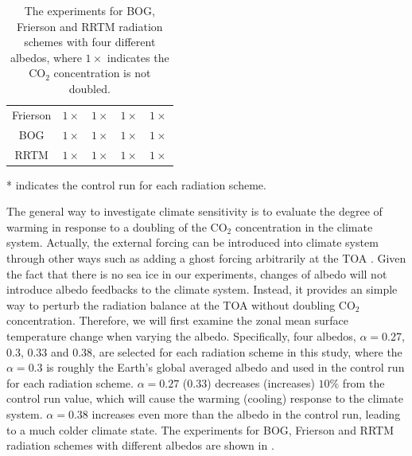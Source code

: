 \begin{table}[ht]
	\centering
	\caption{The experiments for BOG, Frierson and RRTM radiation schemes with four different albedos, where $1\times$ indicates the CO$_2$ concentration is not doubled.} %
	\vspace{0.5em}
	\renewcommand{\arraystretch}{1.3}
	\small
	\begin{threeparttable}
	\begin{tabular}{c|*{4}{c}}
		\toprule
		\diagbox{Scheme}{Albedo} &\makebox[3em]{0.38}&\makebox[3em]{0.33}&\makebox[3em]{0.3\tnote{*}}
		&\makebox[3em]{0.27}\\
	    \midrule
		Frierson & $1\times$ & $1\times$ & $1\times$ & $1\times$ \\ 
		BOG &  $1\times$ & $1\times$ & $1\times$& $1\times$ \\
		RRTM & $1\times$ & $1\times$ & $1\times$ & $1\times$ \\
		\bottomrule
	\end{tabular}%
	\begin{tablenotes}
      \item[*] indicates the control run for each radiation scheme.
     \end{tablenotes}
	\end{threeparttable}
	\label{tab:exp_table}
\end{table}

The general way to investigate climate sensitivity is to evaluate the degree of warming in response to a doubling of the CO$_2$ concentration in the climate system. Actually, the external forcing can be introduced into climate system through other ways such as adding a ghost forcing  arbitrarily at the TOA \citep{Hansen1997,Alexeev2005}. Given the fact that there is no sea ice in our experiments, changes of albedo will not introduce albedo feedbacks to the climate system. Instead, it provides an simple way to perturb the radiation balance at the TOA without doubling CO$_2$ concentration. Therefore, we will first examine the zonal mean surface temperature change when varying the albedo. Specifically, four albedos, $\alpha=$0.27, 0.3, 0.33 and 0.38, are selected for each radiation scheme in this study, where the $\alpha = 0.3$ is roughly the Earth's global averaged albedo and used in the control run for each radiation scheme. $\alpha=0.27$ (0.33) decreases (increases) $10\%$ from the control run value, which will cause the warming (cooling) response to the climate system. $\alpha=0.38$ increases even more than the albedo in the control run, leading to a much colder climate state. The experiments for BOG, Frierson and RRTM radiation schemes with different albedos are shown in .

